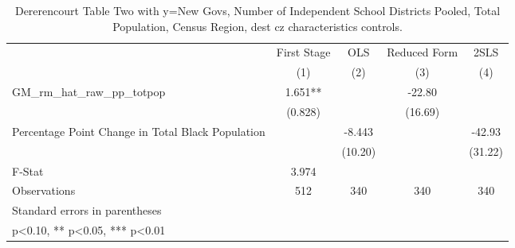 \begin{table}[htbp]\centering
\def\sym#1{\ifmmode^{#1}\else\(^{#1}\)\fi}
\caption{Dererencourt Table Two with y=New Govs, Number of Independent School Districts  Pooled, Total Population, Census Region, dest cz characteristics controls.}
\begin{tabular}{l*{4}{c}}
\toprule
                    & First Stage   &         OLS   &Reduced Form   &        2SLS   \\
                    &\multicolumn{1}{c}{(1)}   &\multicolumn{1}{c}{(2)}   &\multicolumn{1}{c}{(3)}   &\multicolumn{1}{c}{(4)}   \\
\midrule
GM\_rm\_hat\_raw\_pp\_totpop&       1.651** &               &      -22.80   &               \\
                    &     (0.828)   &               &     (16.69)   &               \\
\addlinespace
Percentage Point Change in Total Black Population&               &      -8.443   &               &      -42.93   \\
                    &               &     (10.20)   &               &     (31.22)   \\
\midrule
F-Stat              &       3.974   &               &               &               \\
Observations        &         512   &         340   &         340   &         340   \\
\bottomrule
\multicolumn{5}{l}{\footnotesize Standard errors in parentheses}\\
\multicolumn{5}{l}{\footnotesize * p<0.10, ** p<0.05, *** p<0.01}\\
\end{tabular}
\end{table}
